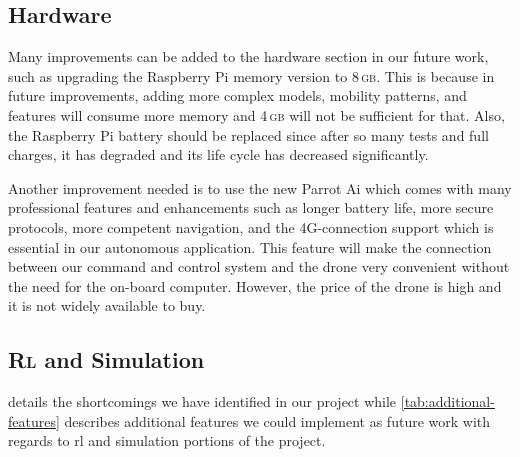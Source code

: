 \documentclass[../main.tex]{subfiles}
\begin{document}
\subsection{Hardware}

Many improvements can be added to the hardware section in our future work,
such as upgrading the Raspberry Pi memory version to 8\,\textsc{gb}.
This is because in future improvements, adding more complex models,
mobility patterns, and features will consume more memory and
4\,\textsc{gb} will not be sufficient for that.
Also, the Raspberry Pi battery should be replaced since after so many
tests and full charges, it has degraded and its life cycle has
decreased significantly. 

Another improvement needed is to use the new Parrot \anafi Ai which comes
with many professional features and enhancements such as longer
battery life, more secure protocols, more competent navigation, and
the 4G-connection support which is essential in our autonomous
application.
This feature will make the connection between our command and control
system and the drone very convenient without the need for the on-board
computer. 
However, the price of the drone is high and it is not widely
available to buy.

\subsection{\textsc{Rl} and Simulation}

 details the shortcomings we have identified in
our project while \cref{tab:additional-features} describes additional
features we could implement as future work with regards to \gls{rl}
and simulation portions of the project.
\end{document}
